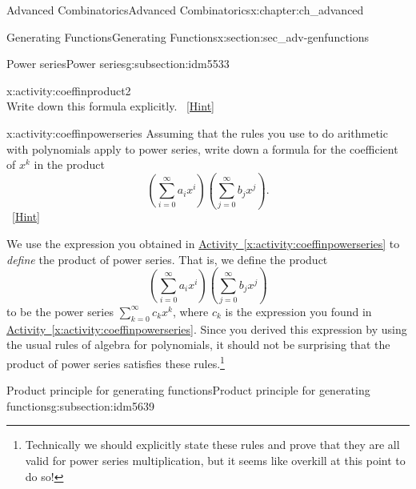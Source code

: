 \documentclass[oneside,10pt,]{book}
\numberwithin{equation}{chapter}
\begin{document}
\begin{chapterptx}{Advanced Combinatorics}{}{Advanced Combinatorics}{}{}{x:chapter:ch_advanced}
\begin{sectionptx}{Generating Functions}{}{Generating Functions}{}{}{x:section:sec_adv-genfunctions}
\begin{subsectionptx}{Power series}{}{Power series}{}{}{g:subsection:idm5533}
\begin{activity}{}{x:activity:coeffinproduct2}
\begin{equation*}
\end{equation*}
Write down this formula explicitly.%
\qquad~\hfill{\tiny\hyperlink{g:hint:idm5609-back}{[Hint]}}\end{activity}
\begin{activity}{}{x:activity:coeffinpowerseries}%
Assuming that the rules you use to do arithmetic with polynomials apply to power series, write down a formula for the coefficient of \(x^k\) in the product%
\begin{equation*}
\left(\sum_{i=0}^\infty a_ix^i\right)\left(\sum_{j=0}^\infty
b_jx^j\right)\text{.}
\end{equation*}
%
\qquad~\hfill{\tiny\hyperlink{g:hint:idm5624-back}{[Hint]}}\end{activity}
We use the expression you obtained in \hyperref[x:activity:coeffinpowerseries]{Activity~\ref{x:activity:coeffinpowerseries}} to \emph{define} the product of power series. That is, we define the product%
\begin{equation*}
\left(\sum_{i=0}^\infty a_ix^i\right)\left(\sum_{j=0}^\infty
b_jx^j\right)
\end{equation*}
to be the power series \(\sum_{k=0}^\infty c_k x^k\), where \(c_k\) is the expression you found in \hyperref[x:activity:coeffinpowerseries]{Activity~\ref{x:activity:coeffinpowerseries}}. Since you derived this expression by using the usual rules of algebra for polynomials, it should not be surprising that the product of power series satisfies these rules.\footnote{Technically we should explicitly state these rules and prove that they are all valid for power series multiplication, but it seems like overkill at this point to do so!\label{g:fn:idm5638}}%
\end{subsectionptx}
%
%
\typeout{************************************************}
\typeout{************************************************}
%
\begin{subsectionptx}{Product principle for generating functions}{}{Product principle for generating functions}{}{}{g:subsection:idm5639}

\end{subsectionptx}
\end{sectionptx}
\end{chapterptx}
\end{document}
